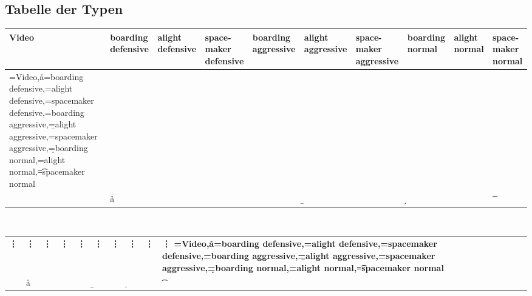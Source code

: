 \begin{appendix}
\section{Tabelle der Typen}
\begin{sidewaystable}[h!]
	\centering
	\begin{tabular}{ |p{1 cm} p{1.9 cm} p{1.9 cm} p{1.9 cm} p{2.1 cm} p{1.9 cm} p{2.1 cm} p{1.6 cm} p{1.5 cm} p{1.5 cm}|}
		\hline
		\bfseries Video & \bfseries boarding defensive & \bfseries alight defensive & \bfseries space-maker defensive  & \bfseries boarding aggressive & \bfseries alight aggressive & \bfseries space-maker aggressive & \bfseries boarding normal  & \bfseries alight normal & \bfseries space-maker normal \\
		\hline
		\DTLforeach*[\value{DTLrowi}<10]{Types}%
		{\video=Video,\aa=boarding defensive,\ab=alight defensive,\sp=spacemaker defensive,\be=boarding aggressive,\b=alight aggressive,\s=spacemaker aggressive,\d=boarding normal,\iw=alight normal,\t=spacemaker normal}
		{
		\\\video & \aa & \ab & \sp & \be & \b & \s &\d & \iw & \t}
	\end{tabular} \\
	\begin{tabular}{|p{1 cm} p{1.9 cm} p{1.9 cm} p{1.9 cm} p{2.1 cm} p{1.9 cm} p{2.1 cm} p{1.6 cm} p{1.5 cm} p{1.5 cm}|}
		\bfseries \vdots & \bfseries \vdots & \bfseries \vdots & \bfseries \vdots & \bfseries \vdots & \bfseries \vdots & \bfseries \vdots & \bfseries \vdots & \bfseries \vdots & \bfseries \vdots
		\DTLforeach*[\DTLisgt{\video}{3183}]{Types}
		{\video=Video,\aa=boarding defensive,\ab=alight defensive,\sp=spacemaker defensive,\be=boarding aggressive,\b=alight aggressive,\s=spacemaker aggressive,\d=boarding normal,\iw=alight normal,\t=spacemaker normal}
		{
		\\\video & \aa & \ab & \sp & \be & \b & \s &\d & \iw & \t}\\
		\hline
	\end{tabular}
	\caption{Typen von Prozesstypen: Zusatzmaterial \textsl{PeopleTypes.csv} Quelle: Eigene Tabelle.}
	\label{tab:Types}
\end{sidewaystable}
\clearpage

\end{appendix}
